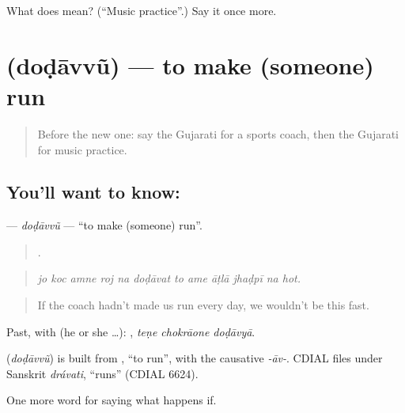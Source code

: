 \begin{tcolorbox}[breakable,colback=teal!4,colframe=teal!35!black,title={Before you move on}]
What does  mean? (\textquotedblleft{}Music practice\textquotedblright{}.) Say it once more.
\end{tcolorbox}
\section[\texorpdfstring{\gu{દોડાવવું} (doḍāvvũ)}{દોડાવવું (doḍāvvũ)}]{ (doḍāvvũ) — to make (someone) run}

\label{lesson:GU-C551-dodavvu}



\begin{quote}
Before the new one: say the Gujarati for a sports coach, then the Gujarati for music practice.
\end{quote}

\subsection*{You'll want to know: }
\textbf{} — \emph{doḍāvvũ} — \textquotedblleft{}to make (someone) run\textquotedblright{}.

\begin{quote}
           .
\end{quote}

\begin{quote}
\emph{jo koc amne roj na doḍāvat to ame āṭlā jhaḍpī na hot.}
\end{quote}

\begin{quote}
If the coach hadn't made us run every day, we wouldn't be this fast.
\end{quote}

Past, with  (he or she …):   , \emph{teṇe chokrāone doḍāvyā}.

\begin{cousinweb}
\textbf{} (\emph{doḍāvvũ}) is built from \textbf{}, \textquotedblleft{}to run\textquotedblright{}, with the causative \emph{-āv-}. CDIAL files \textbf{} under Sanskrit \emph{drávati}, \textquotedblleft{}runs\textquotedblright{} (CDIAL 6624).
\end{cousinweb}

\begin{grammarlens}[title={What you've built}]
One more word for saying what happens if.
\end{grammarlens}

